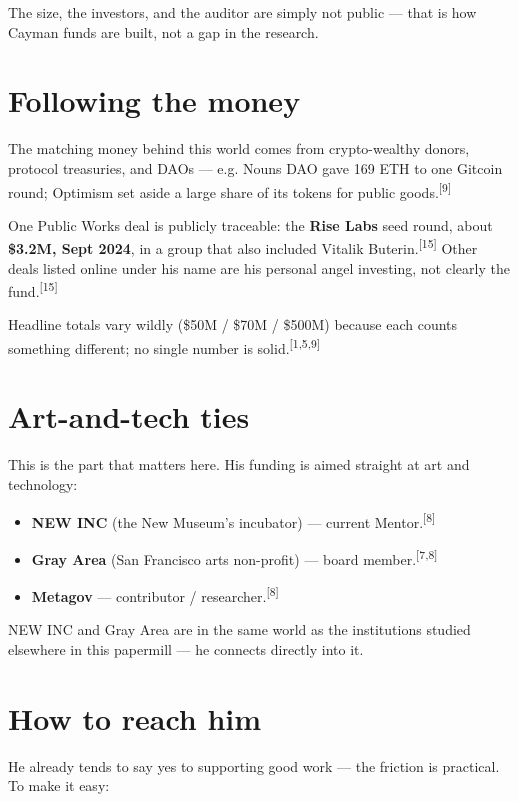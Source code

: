 \documentclass[11pt]{article}
\newcommand{\refn}[1]{\textsuperscript{[#1]}}
\begin{document}
The size, the investors, and the auditor are simply not public --- that is
how Cayman funds are built, not a gap in the research.

\section{Following the money}

The matching money behind this world comes from crypto-wealthy donors,
protocol treasuries, and DAOs --- e.g. Nouns DAO gave 169 ETH to one Gitcoin
round; Optimism set aside a large share of its tokens for public
goods.\refn{9}

One Public Works deal is publicly traceable: the \textbf{Rise Labs} seed
round, about \textbf{\$3.2M, Sept 2024}, in a group that also included
Vitalik Buterin.\refn{15} Other deals listed online under his name are his
personal angel investing, not clearly the fund.\refn{15}

Headline totals vary wildly (\$50M / \$70M / \$500M) because each counts
something different; no single number is solid.\refn{1,5,9}

\section{Art-and-tech ties}

This is the part that matters here. His funding is aimed straight at art and
technology:

\begin{itemize}
\item \textbf{NEW INC} (the New Museum's incubator) --- current Mentor.\refn{8}
\item \textbf{Gray Area} (San Francisco arts non-profit) --- board member.\refn{7,8}
\item \textbf{Metagov} --- contributor / researcher.\refn{8}
\end{itemize}

NEW INC and Gray Area are in the same world as the institutions studied
elsewhere in this papermill --- he connects directly into it.

\section{How to reach him}

He already tends to say yes to supporting good work --- the friction is
practical. To make it easy:
\end{document}
